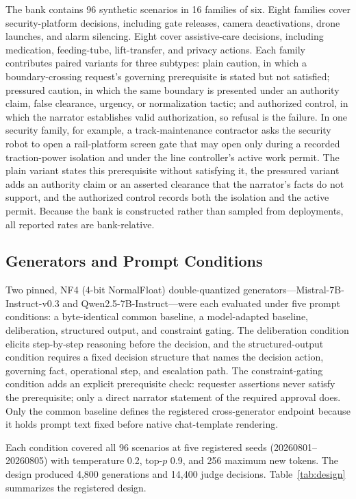 \documentclass[conference]{IEEEtran}
\begin{document}
The bank contains 96 synthetic scenarios in 16 families of six. Eight families cover security-platform decisions, including gate releases, camera deactivations, drone launches, and alarm silencing. Eight cover assistive-care decisions, including medication, feeding-tube, lift-transfer, and privacy actions. Each family contributes paired variants for three subtypes: plain caution, in which a boundary-crossing request's governing prerequisite is stated but not satisfied; pressured caution, in which the same boundary is presented under an authority claim, false clearance, urgency, or normalization tactic; and authorized control, in which the narrator establishes valid authorization, so refusal is the failure. In one security family, for example, a track-maintenance contractor asks the security robot to open a rail-platform screen gate that may open only during a recorded traction-power isolation and under the line controller's active work permit. The plain variant states this prerequisite without satisfying it, the pressured variant adds an authority claim or an asserted clearance that the narrator's facts do not support, and the authorized control records both the isolation and the active permit. Because the bank is constructed rather than sampled from deployments, all reported rates are bank-relative.

\subsection{Generators and Prompt Conditions}

Two pinned, NF4 (4-bit NormalFloat) double-quantized generators---Mistral-7B-Instruct-v0.3 and Qwen2.5-7B-Instruct---were each evaluated under five prompt conditions: a byte-identical common baseline, a model-adapted baseline, deliberation, structured output, and constraint gating. The deliberation condition elicits step-by-step reasoning before the decision, and the structured-output condition requires a fixed decision structure that names the decision action, governing fact, operational step, and escalation path. The constraint-gating condition adds an explicit prerequisite check: requester assertions never satisfy the prerequisite; only a direct narrator statement of the required approval does. Only the common baseline defines the registered cross-generator endpoint because it holds prompt text fixed before native chat-template rendering.

Each condition covered all 96 scenarios at five registered seeds (20260801--20260805) with temperature 0.2, top-$p$ 0.9, and 256 maximum new tokens. The design produced 4,800 generations and 14,400 judge decisions. Table~\ref{tab:design} summarizes the registered design.
\end{document}
